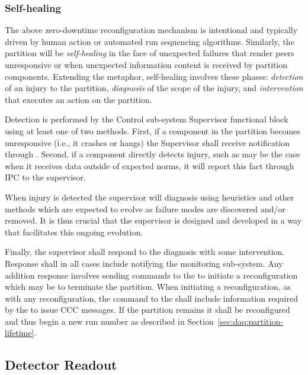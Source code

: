 \subsubsection{Self-healing}
\label{sec:daq:self-healing}

The above zero-downtime reconfiguration mechanism is intentional and typically driven by human action or automated run sequencing algorithms. 
Similarly, the partition will be \textit{self-healing} in the face of unexpected failures that render peers unresponsive or when unexpected information content is received by partition components.  
Extending the metaphor, self-healing involves these phases: \textit{detection} of an injury to the partition, \textit{diagnosis} of the scope of the injury, and \textit{intervention} that executes an action on the partition.

Detection is performed by the  Control sub-system Supervisor functional block using at least one of two methods.
First, if a component in the partition becomes unresponsive (i.e., it crashes or hangs) the Supervisor shall receive notification through  . 
Second, if a component directly detects injury, such as may be the case when it receives  data outside of expected norms, it will report this fact through IPC to the supervisor.

When injury is detected the supervisor will diagnosis using heuristics and other methods which are expected to evolve as failure modes are discovered and/or removed. 
It is thus crucial that the supervisor is designed and developed in a way that facilitates this ongoing evolution.  

Finally, the supervisor shall respond to the diagnosis with some intervention. 
Response shall in all cases include notifying the monitoring sub-system. 
Any addition response involves sending commands to the  to initiate a reconfiguration which may be to terminate the partition.
When initiating a reconfiguration, as with any reconfiguration, the command to the  shall include information required by the  to issue CCC messages. 
If the partition remains it shall be reconfigured and thus begin a new run number as described in Section~\ref{sec:daq:partition-lifetime}.


\subsection{Detector Readout}
\label{sec:daq:design-readout}

